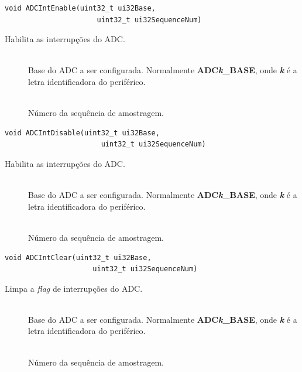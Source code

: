 \begin{lstlisting}[style=funcao]
	void ADCIntEnable(uint32_t ui32Base,
					  uint32_t ui32SequenceNum)
\end{lstlisting}

Habilita as interrupções do ADC.

\begin{description}
	\item []\hfill \\
	Base do ADC a ser configurada. Normalmente \textbf{ADC\emph{k}\_BASE}, onde \textbf{\emph{k}} é a letra identificadora do periférico.
	
	\item []\hfill \\
	Número da sequência de amostragem.
\end{description}

\begin{lstlisting}[style=funcao]
	void ADCIntDisable(uint32_t ui32Base,
					   uint32_t ui32SequenceNum)
\end{lstlisting}

Habilita as interrupções do ADC.

\begin{description}
	\item []\hfill \\
	Base do ADC a ser configurada. Normalmente \textbf{ADC\emph{k}\_BASE}, onde \textbf{\emph{k}} é a letra identificadora do periférico.
	
	\item []\hfill \\
	Número da sequência de amostragem.
\end{description}

\begin{lstlisting}[style=funcao]
	void ADCIntClear(uint32_t ui32Base,
					 uint32_t ui32SequenceNum)
\end{lstlisting}

Limpa a \emph{flag} de interrupções do ADC.

\begin{description}
	\item []\hfill \\
	Base do ADC a ser configurada. Normalmente \textbf{ADC\emph{k}\_BASE}, onde \textbf{\emph{k}} é a letra identificadora do periférico.
	
	\item []\hfill \\
	Número da sequência de amostragem.
\end{description}

